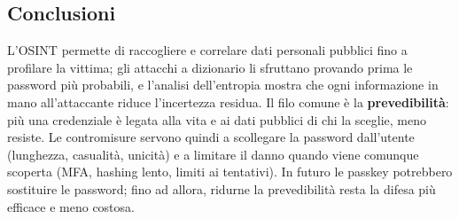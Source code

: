 \subsection{Conclusioni}\label{sec:conclusioni}
 
L'OSINT permette di raccogliere e correlare dati personali pubblici fino a profilare la vittima; gli attacchi a dizionario li sfruttano provando prima le password più probabili, e l'analisi dell'entropia mostra che ogni informazione in mano all'attaccante riduce l'incertezza residua. Il filo comune è la \textbf{prevedibilità}: più una credenziale è legata alla vita e ai dati pubblici di chi la sceglie, meno resiste. Le contromisure servono quindi a scollegare la password dall'utente (lunghezza, casualità, unicità) e a limitare il danno quando viene comunque scoperta (MFA, hashing lento, limiti ai tentativi). In futuro le passkey potrebbero sostituire le password; fino ad allora, ridurne la prevedibilità resta la difesa più efficace e meno costosa.

